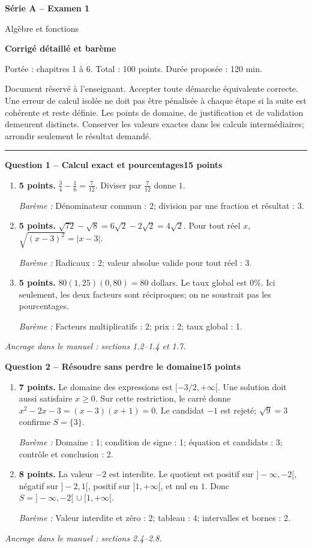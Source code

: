 \documentclass[11pt,a4paper]{article}
\begin{document}
{\LARGE\bfseries Série A -- Examen 1}\par
{\large Algèbre et fonctions}\par
\textbf{Corrigé détaillé et barème}\par
Portée : chapitres 1 à 6. Total : 100 points. Durée proposée : 120 min.\par
\small Document réservé à l’enseignant. Accepter toute démarche équivalente correcte. Une erreur de calcul isolée ne doit pas être pénalisée à chaque étape si la suite est cohérente et reste définie. Les points de domaine, de justification et de validation demeurent distincts. Conserver les valeurs exactes dans les calculs intermédiaires; arrondir seulement le résultat demandé.\normalsize\par
\vspace{3mm}\hrule\vspace{4mm}
{\large\bfseries Question 1 -- Calcul exact et pourcentages}\hfill\textbf{15 points}\par
\begin{enumerate}
\item \textbf{5 points.} \(\frac34-\frac16=\frac7{12}\). Diviser par \(\frac7{12}\) donne \(1\).
\par{\small\textit{Barème : }Dénominateur commun : 2; division par une fraction et résultat : 3.}
\item \textbf{5 points.} \(\sqrt{72}-\sqrt8=6\sqrt2-2\sqrt2=4\sqrt2\). Pour tout réel \(x\), \(\sqrt{(x-3)^2}=|x-3|\).
\par{\small\textit{Barème : }Radicaux : 2; valeur absolue valide pour tout réel : 3.}
\item \textbf{5 points.} \(80(1{,}25)(0{,}80)=80\) dollars. Le taux global est \(0\%\). Ici seulement, les deux facteurs sont réciproques; on ne soustrait pas les pourcentages.
\par{\small\textit{Barème : }Facteurs multiplicatifs : 2; prix : 2; taux global : 1.}
\end{enumerate}
\vfill {\small\textit{Ancrage dans le manuel : sections 1.2--1.4 et 1.7.}}

\newpage
{\large\bfseries Question 2 -- Résoudre sans perdre le domaine}\hfill\textbf{15 points}\par
\begin{enumerate}
\item \textbf{7 points.} Le domaine des expressions est \([ -3/2,+\infty[\). Une solution doit aussi satisfaire \(x\ge0\). Sur cette restriction, le carré donne \(x^2-2x-3=(x-3)(x+1)=0\). Le candidat \(-1\) est rejeté; \(\sqrt9=3\) confirme \(S=\{3\}\).
\par{\small\textit{Barème : }Domaine : 1; condition de signe : 1; équation et candidats : 3; contrôle et conclusion : 2.}
\item \textbf{8 points.} La valeur \(-2\) est interdite. Le quotient est positif sur \(]-\infty,-2[\), négatif sur \(]-2,1[\), positif sur \(]1,+\infty[\), et nul en \(1\). Donc \(S=]-\infty,-2[\,\cup[1,+\infty[\).
\par{\small\textit{Barème : }Valeur interdite et zéro : 2; tableau : 4; intervalles et bornes : 2.}
\end{enumerate}
\vfill {\small\textit{Ancrage dans le manuel : sections 2.4--2.8.}}
\end{document}
